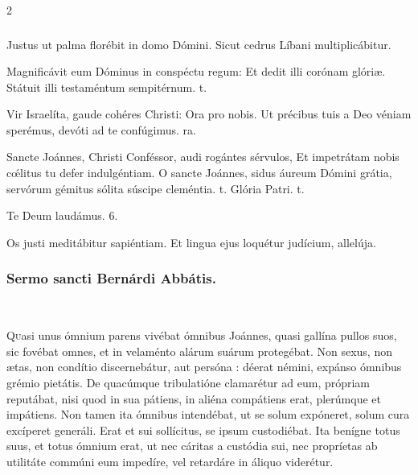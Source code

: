 \documentclass[9pt,twoside]{extarticle}
\begin{document}
\begin{multicols}{2}
\subsubsection*{}
\begin{tightlist}{}
\item {} Justus ut palma florébit in domo Dómini.  Sicut cedrus Líbani multiplicábitur.
\item {} Magnificávit eum Dóminus in conspéctu regum: \textred{*} Et dedit illi corónam glóriæ.  Státuit illi testaméntum sempitérnum. t.
\item {} Vir Israelíta, gaude cohéres Christi: \textred{*} Ora pro nobis.  Ut précibus tuis a Deo véniam sperémus, devóti ad te confúgimus. ra.
\item {} Sancte Joánnes, Christi Conféssor, audi rogántes sérvulos, \textred{*} Et impetrátam nobis cœ́litus tu defer indulgéntiam.  O sancte Joánnes, sidus áureum Dómini grátia, servórum gémitus sólita súscipe cleméntia. t. Glória Patri. t. 
\item Te Deum laudámus. 6.
\item {} Os justi meditábitur sapiéntiam.  Et lingua ejus loquétur judícium, allelúja.
\end{tightlist}

\begin{tightlist}{}
\item {}
\end{tightlist}

\subsubsection*{\center Sermo sancti Bernárdi Abbátis.}
\begin{center}\\
\end{center}
\lettrine{Q}uasi unus ómnium parens vivébat ómnibus Joánnes, quasi gallína pullos suos, sic fovébat omnes, et in velaménto alárum suárum protegébat. Non sexus, non ætas, non condítio discernebátur, aut persóna : déerat némini, expánso ómnibus grémio pietátis. De quacúmque tribulatióne clamarétur ad eum, própriam reputábat, nisi quod in sua pátiens, in aliéna compátiens erat, plerúmque et impátiens. Non tamen ita ómnibus intendébat, ut se solum expóneret, solum cura excíperet generáli. Erat et sui sollícitus, se ipsum custodiébat. Ita benígne totus suus, et totus ómnium erat, ut nec cáritas a custódia sui, nec propríetas ab utilitáte commúni eum impedíre, vel retardáre in áliquo viderétur.


\end{multicols}
\end{document}
